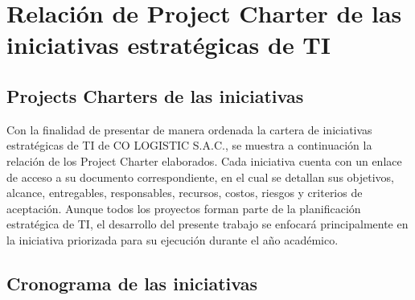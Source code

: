 \documentclass[11pt, a4paper, oneside]{report}
\begin{document}
\section{Relación de Project Charter de las iniciativas estratégicas de TI}

\subsection{Projects Charters de las iniciativas}
Con la finalidad de presentar de manera ordenada la cartera de iniciativas estratégicas de TI de CO LOGISTIC S.A.C., se muestra a continuación la relación de los Project Charter elaborados. Cada iniciativa cuenta con un enlace de acceso a su documento correspondiente, en el cual se detallan sus objetivos, alcance, entregables, responsables, recursos, costos, riesgos y criterios de aceptación. Aunque todos los proyectos forman parte de la planificación estratégica de TI, el desarrollo del presente trabajo se enfocará principalmente en la iniciativa priorizada para su ejecución durante el año académico.

\subsection{Cronograma de las iniciativas}
\end{document}
